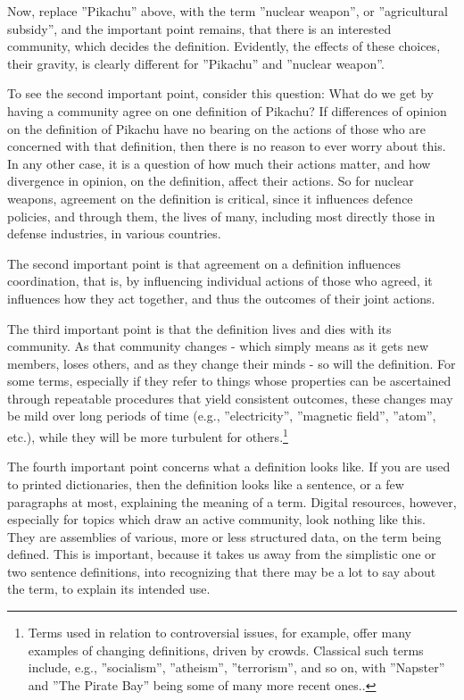 Now, replace ''Pikachu'' above, with the term ''nuclear weapon'', or ''agricultural subsidy'', and the important point remains, that there is an interested community, which decides the definition. Evidently, the effects of these choices, their gravity, is clearly different for ''Pikachu'' and ''nuclear weapon''.

To see the second important point, consider this question: What do we get by having a community agree on one definition of Pikachu? If differences of opinion on the definition of Pikachu have no bearing on the actions of those who are concerned with that definition, then there is no reason to ever worry about this. In any other case, it is a question of how much their actions matter, and how divergence in opinion, on the definition, affect their actions. So for nuclear weapons, agreement on the definition is critical, since it influences defence policies, and through them, the lives of many, including most directly those in defense industries, in various countries.

The second important point is that agreement on a definition influences coordination, that is, by influencing individual actions of those who agreed, it influences how they act together, and thus the outcomes of their joint actions.

The third important point is that the definition lives and dies with its community. As that community changes - which simply means as it gets new members, loses others, and as they change their minds - so will the definition. For some terms, especially if they refer to things whose properties can be ascertained through repeatable procedures that yield consistent outcomes, these changes may be mild over long periods of time (e.g., ''electricity'', ''magnetic field'', ''atom'', etc.), while they will be more turbulent for others.\footnote{Terms used in relation to controversial issues, for example, offer many examples of changing definitions, driven by crowds. Classical such terms include, e.g., ''socialism'', ''atheism'', ''terrorism'', and so on, with ''Napster'' and ''The Pirate Bay'' being some of many more recent ones.\cite{wikipedia-controversial-issues,yasseri2014most}.}

The fourth important point concerns what a definition looks like. If you are used to printed dictionaries, then the definition looks like a sentence, or a few paragraphs at most, explaining the meaning of a term. Digital resources, however, especially for topics which draw an active community, look nothing like this. They are assemblies of various, more or less structured data, on the term being defined. This is important, because it takes us away from the simplistic one or two sentence definitions, into recognizing that there may be a lot to say about the term, to explain its intended use.

